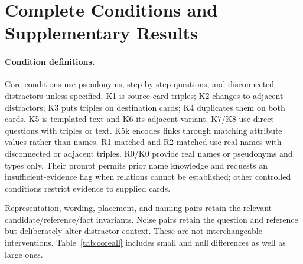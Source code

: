 \appendix
\section{Complete Conditions and Supplementary Results}
\label{app:conditions}
\paragraph{Condition definitions.}
Core conditions use pseudonyms, step-by-step questions, and disconnected distractors unless specified. K1 is source-card triples; K2 changes to adjacent distractors; K3 puts triples on destination cards; K4 duplicates them on both cards. K5 is templated text and K6 its adjacent variant. K7/K8 use direct questions with triples or text. K5k encodes links through matching attribute values rather than names. R1-matched and R2-matched use real names with disconnected or adjacent triples. R0/K0 provide real names or pseudonyms and types only. Their prompt permits prior name knowledge and requests an insufficient-evidence flag when relations cannot be established; other controlled conditions restrict evidence to supplied cards.

Representation, wording, placement, and naming pairs retain the relevant candidate/reference/fact invariants. Noise pairs retain the question and reference but deliberately alter distractor context. These are not interchangeable interventions. Table~\ref{tab:coreall} includes small and null differences as well as large ones.

\begin{table}[h]
\caption{All Core conditions: mean F1 / exact selection, each over 700 planned tasks/model. Invalid outcomes contribute zero. These are descriptive absolute means, not confidence intervals.}
\label{tab:coreall}
\centering\small

\end{table}

\begin{table}[h]
\caption{Selected controlled presentation contrasts, paired mean F1 differences over 700 planned pairs/model. Their full interval records remain in the analysis archive. Means crossing zero in uncertainty analyses are not evidence of equivalence.}
\label{tab:presentation}
\centering\small

\end{table}

\begin{table}[t]
\caption{All variable-family Raw+E size endpoints: smallest ($s$) and largest ($l$) available sizes, with 100 planned tasks per endpoint/model. These are descriptive comparisons of different sampled strata; endpoint direction does not imply monotonic intermediate values.}
\label{tab:sizeendpoints}
\centering\small

\end{table}

